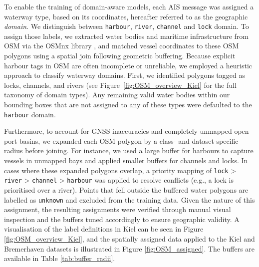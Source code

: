     
To enable the training of domain-aware models, each \ac{AIS} message was assigned a waterway type, based on its coordinates, hereafter referred to as the geographic \emph{domain}. We distinguish between \texttt{harbour}, \texttt{river}, \texttt{channel} and \texttt{lock} domain.
To assign those labels, we extracted water bodies and maritime infrastructure from \ac{OSM} via the OSMnx library \parencite{OpenStreetMap}, and matched vessel coordinates to these \ac{OSM} polygons using a spatial join following geometric buffering. %
Because explicit harbour tags in \ac{OSM} are often incomplete or unreliable, we employed a heuristic approach to classify waterway domains. 
First, we identified polygons tagged as locks, channels, and rivers (see Figure~\ref{fig:OSM_overview_Kiel} for the full taxonomy of domain types).
Any remaining valid water bodies within our bounding boxes that are not 
assigned to any of these types were defaulted to the \texttt{harbour} domain.

Furthermore, to account for \ac{GNSS} inaccuracies and completely unmapped open port basins, we expanded each \ac{OSM} polygon by a class- and dataset-specific radius before joining.
For instance, we used a large buffer for harbours to capture vessels in unmapped bays and applied smaller buffers for channels and locks.
In cases where these expanded polygons overlap, a priority mapping of \texttt{lock} > \texttt{river} > \texttt{channel} > \texttt{harbour} was applied to resolve conflicts (e.g., a lock is prioritised over a river). %
Points that fell outside the buffered water polygons are labelled as \texttt{unknown} and excluded from the training data. Given the %
 nature of this assignment, the resulting assignments were verified through manual visual inspection and the buffers tuned accordingly to ensure geographic validity. A visualisation of the label definitions in Kiel can be seen in Figure \ref{fig:OSM_overview_Kiel}, and the spatially assigned data applied to the Kiel and Bremerhaven datasets is illustrated in Figure \ref{fig:OSM_assigned}. The buffers are available in Table \ref{tab:buffer_radii}.

